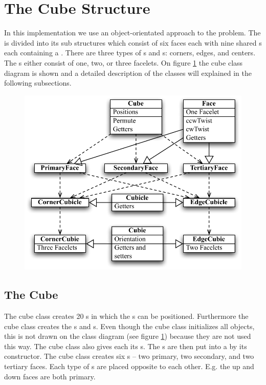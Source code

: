 \section{The Cube Structure}
In this implementation we use an object-orientated approach to the problem.
The \rubik{} is divided into its sub structures which consist of six faces each with nine shared \cubicle{}s each containing a \cubie{}.
There are three types of \cpiece{}s and \cubicle{}s: corners, edges, and centers. 
The \cubie{}s either consist of one, two, or three facelets.
On figure \ref{fig:cubeClassDiagram} the cube class diagram is shown and a detailed description of the classes will explained in the following subsections.

\begin{figure}[htbp]
	\centering
		\includegraphics[scale=0.75]{input/pics/cubeClassDiagram.pdf}
	\caption{}
	\label{fig:cubeClassDiagram}
\end{figure}

\subsection{The Cube}
The cube class creates 20 \cubicle{}s in which the \cpiece{}s can be positioned. Furthermore the cube class creates the \face{}s and \cubie{}s. Even though the cube class initializes all objects, this is not drawn on the class diagram (see figure \ref{fig:cubeClassDiagram}) because they are not used this way. The cube class also gives each \cpiece{} its \facelet{}s. The \cubicle{}s are then put into a \face{} by its constructor. The cube class creates six \face{}s -- two primary, two secondary, and two tertiary faces. Each type of \face{}s are placed opposite to each other. E.g. the up and down faces are both primary. 

